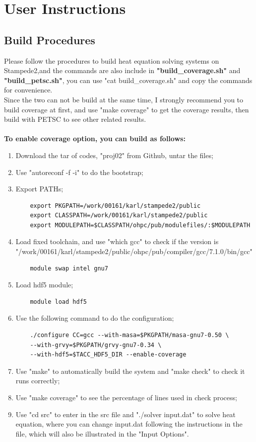 \documentclass[a4paper]{article}
\begin{document}
\newpage
\section{User Instructions}
\subsection{Build Procedures}
Please follow the procedures to build heat equation solving systems on Stampede2,and the commands are also include in \textbf{"build\_coverage.sh"} and \textbf{"build\_petsc.sh"}, you can use "cat build\_coverage.sh" and copy the commands for convenience.\\
Since the two can not be build at the same time, I strongly recommend you to build coverage at first, and use "make coverage" to get the coverage results, then build with PETSC to see other related results.\\\\
\textbf{To enable coverage option, you can build as follows:}
\begin{enumerate}
    \item Download the tar of codes, "proj02" from Github, untar the files;
    \item Use "autoreconf -f -i" to do the bootstrap;
    \item Export PATHs;
    \begin{verbatim}
    export PKGPATH=/work/00161/karl/stampede2/public
    export CLASSPATH=/work/00161/karl/stampede2/public
    export MODULEPATH=$CLASSPATH/ohpc/pub/modulefiles/:$MODULEPATH
    \end{verbatim}
    \item Load fixed toolchain, and use "which gcc" to check if the version is "/work/00161/karl/stampede2/public/ohpc/pub/compiler/gcc/7.1.0/bin/gcc"
    \begin{verbatim}
    module swap intel gnu7
    \end{verbatim}
    \item Load hdf5 module;
    \begin{verbatim}
    module load hdf5
    \end{verbatim}
    \item Use the following command to do the configuration;
    \begin{verbatim}
    ./configure CC=gcc --with-masa=$PKGPATH/masa-gnu7-0.50 \
    --with-grvy=$PKGPATH/grvy-gnu7-0.34 \
    --with-hdf5=$TACC_HDF5_DIR --enable-coverage
    \end{verbatim}
    \item Use "make" to automatically build the system and "make check" to check it runs correctly;
    \item Use "make coverage" to see the percentage of lines used in check process;
    \item Use "cd src" to enter in the src file and "./solver input.dat" to solve heat equation, where you can change input.dat following the instructions in the file, which will also be illustrated in the "Input Options".
\end{enumerate}
\end{document}
